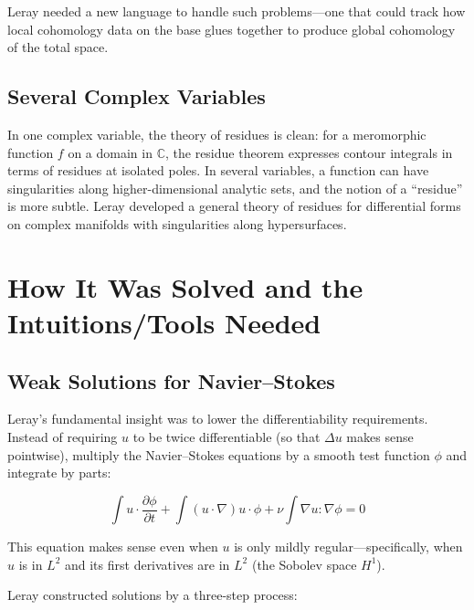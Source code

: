 Leray needed a new language to handle such problems---one that could track how local cohomology data on the base glues together to produce global cohomology of the total space.

\subsection{Several Complex Variables}

In one complex variable, the theory of residues is clean: for a meromorphic function $f$ on a domain in $\mathbb{C}$, the residue theorem expresses contour integrals in terms of residues at isolated poles. In several variables, a function can have singularities along higher-dimensional analytic sets, and the notion of a ``residue'' is more subtle. Leray developed a general theory of residues for differential forms on complex manifolds with singularities along hypersurfaces.

\section{How It Was Solved and the Intuitions/Tools Needed}

\subsection{Weak Solutions for Navier--Stokes}

Leray's fundamental insight was to lower the differentiability requirements. Instead of requiring $u$ to be twice differentiable (so that $\Delta u$ makes sense pointwise), multiply the Navier--Stokes equations by a smooth test function $\phi$ and integrate by parts:

\[
\int u \cdot \frac{\partial \phi}{\partial t} + \int (u \cdot \nabla) u \cdot \phi + \nu \int \nabla u : \nabla \phi = 0
\]

This equation makes sense even when $u$ is only mildly regular---specifically, when $u$ is in $L^2$ and its first derivatives are in $L^2$ (the Sobolev space $H^1$).

Leray constructed solutions by a three-step process:

